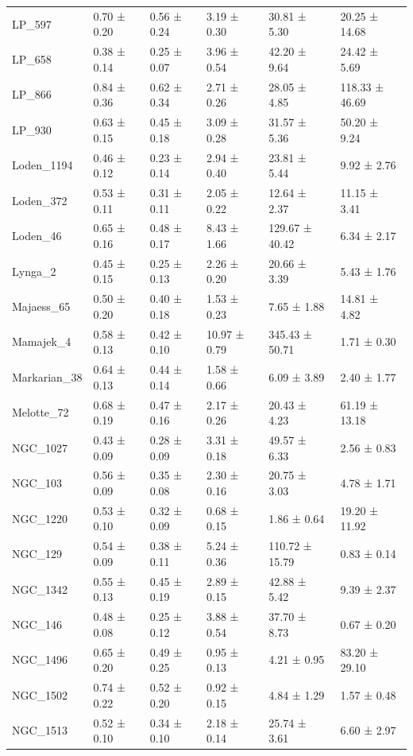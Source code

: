 \begin{tabular}{llllll}
LP_597 & 0.70 ± 0.20 & 0.56 ± 0.24 & 3.19 ± 0.30 & 30.81 ± 5.30 & 20.25 ± 14.68 \\
LP_658 & 0.38 ± 0.14 & 0.25 ± 0.07 & 3.96 ± 0.54 & 42.20 ± 9.64 & 24.42 ± 5.69 \\
LP_866 & 0.84 ± 0.36 & 0.62 ± 0.34 & 2.71 ± 0.26 & 28.05 ± 4.85 & 118.33 ± 46.69 \\
LP_930 & 0.63 ± 0.15 & 0.45 ± 0.18 & 3.09 ± 0.28 & 31.57 ± 5.36 & 50.20 ± 9.24 \\
Loden_1194 & 0.46 ± 0.12 & 0.23 ± 0.14 & 2.94 ± 0.40 & 23.81 ± 5.44 & 9.92 ± 2.76 \\
Loden_372 & 0.53 ± 0.11 & 0.31 ± 0.11 & 2.05 ± 0.22 & 12.64 ± 2.37 & 11.15 ± 3.41 \\
Loden_46 & 0.65 ± 0.16 & 0.48 ± 0.17 & 8.43 ± 1.66 & 129.67 ± 40.42 & 6.34 ± 2.17 \\
Lynga_2 & 0.45 ± 0.15 & 0.25 ± 0.13 & 2.26 ± 0.20 & 20.66 ± 3.39 & 5.43 ± 1.76 \\
Majaess_65 & 0.50 ± 0.20 & 0.40 ± 0.18 & 1.53 ± 0.23 & 7.65 ± 1.88 & 14.81 ± 4.82 \\
Mamajek_4 & 0.58 ± 0.13 & 0.42 ± 0.10 & 10.97 ± 0.79 & 345.43 ± 50.71 & 1.71 ± 0.30 \\
Markarian_38 & 0.64 ± 0.13 & 0.44 ± 0.14 & 1.58 ± 0.66 & 6.09 ± 3.89 & 2.40 ± 1.77 \\
Melotte_72 & 0.68 ± 0.19 & 0.47 ± 0.16 & 2.17 ± 0.26 & 20.43 ± 4.23 & 61.19 ± 13.18 \\
NGC_1027 & 0.43 ± 0.09 & 0.28 ± 0.09 & 3.31 ± 0.18 & 49.57 ± 6.33 & 2.56 ± 0.83 \\
NGC_103 & 0.56 ± 0.09 & 0.35 ± 0.08 & 2.30 ± 0.16 & 20.75 ± 3.03 & 4.78 ± 1.71 \\
NGC_1220 & 0.53 ± 0.10 & 0.32 ± 0.09 & 0.68 ± 0.15 & 1.86 ± 0.64 & 19.20 ± 11.92 \\
NGC_129 & 0.54 ± 0.09 & 0.38 ± 0.11 & 5.24 ± 0.36 & 110.72 ± 15.79 & 0.83 ± 0.14 \\
NGC_1342 & 0.55 ± 0.13 & 0.45 ± 0.19 & 2.89 ± 0.15 & 42.88 ± 5.42 & 9.39 ± 2.37 \\
NGC_146 & 0.48 ± 0.08 & 0.25 ± 0.12 & 3.88 ± 0.54 & 37.70 ± 8.73 & 0.67 ± 0.20 \\
NGC_1496 & 0.65 ± 0.20 & 0.49 ± 0.25 & 0.95 ± 0.13 & 4.21 ± 0.95 & 83.20 ± 29.10 \\
NGC_1502 & 0.74 ± 0.22 & 0.52 ± 0.20 & 0.92 ± 0.15 & 4.84 ± 1.29 & 1.57 ± 0.48 \\
NGC_1513 & 0.52 ± 0.10 & 0.34 ± 0.10 & 2.18 ± 0.14 & 25.74 ± 3.61 & 6.60 ± 2.97 \\

\end{tabular}
